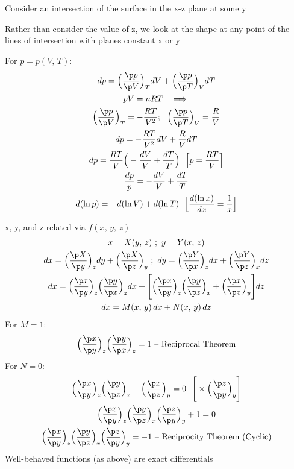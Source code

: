 \documentclass[a4paper, 11pt, normalem]{report}
\begin{document}
Consider an intersection of the surface in the x-z plane at some y

Rather than consider the value of z, we look at the shape at any point of the lines of intersection with planes constant x or y

For $p = p(V,\,T)$:
\begin{gather*}
    dp = \Big(\frac{\p p}{\p V}\Big)_T dV + \Big(\frac{\p p}{\p T}\Big)_V dT \\
    pV = nRT ~~\implies \\
    \Big(\frac{\p p}{\p V}\Big)_T = -\frac{RT}{V^2};~~ \Big(\frac{\p p}{\p T}\Big)_V = \frac{R}{V} \\
    dp = -\frac{RT}{V^2}dV + \frac{R}{V}dT \\
    dp = \frac{RT}{V}\Big(- \frac{dV}{V} + \frac{dT}{T}\Big)~~ \Big[p = \frac{RT}{V}\Big] \\
    \frac{dp}{p} = - \frac{dV}{V} + \frac{dT}{T} \\
    d(\ln{p}) = -d(\ln{V}) + d(\ln{T})~~ \Big[\frac{d(\ln{x})}{dx} = \frac{1}{x} \Big]
\end{gather*}

x, y, and z related via $f(x,\,y,\,z)$
\begin{gather*}
    x = X(y,\,z)~;~ y = Y(x,\,z) \\
    dx = \Big(\frac{\p X}{\p y} \Big)_z dy + \Big(\frac{\p X}{\p z} \Big)_y ~;~ dy = \Big(\frac{\p Y}{\p x} \Big)_z dx + \Big(\frac{\p Y}{\p z} \Big)_x dz \\
    dx = \Big(\frac{\p x}{\p y} \Big)_z \Big(\frac{\p y}{\p x} \Big)_z dx + \Bigg[\Big(\frac{\p x}{\p y} \Big)_z \Big(\frac{\p y}{\p z} \Big)_x + \Big(\frac{\p x}{\p z} \Big)_y \Bigg] dz \\
    dx = M(x,\,y)\,dx + N(x,\,y)\,dz
\end{gather*}
For $M = 1$:
\begin{equation*}
    \Big(\frac{\p x}{\p y} \Big)_z \Big(\frac{\p y}{\p x} \Big)_z = 1 \text{ -- Reciprocal Theorem}
\end{equation*}
For $N = 0$:
\begin{gather*}
    \Big(\frac{\p x}{\p y} \Big)_z \Big(\frac{\p y}{\p z} \Big)_x + \Big(\frac{\p x}{\p z} \Big)_y = 0 ~~ \Bigg[ \times \Big(\frac{\p z}{\p y} \Big)_y \Bigg] \\
    \Big(\frac{\p x}{\p y} \Big)_z \Big(\frac{\p y}{\p z} \Big)_x \Big(\frac{\p z}{\p y} \Big)_y + 1 = 0 \\
    \Big(\frac{\p x}{\p y} \Big)_z \Big(\frac{\p y}{\p z} \Big)_x \Big(\frac{\p z}{\p y} \Big)_y = -1 \text{ -- Reciprocity Theorem (Cyclic)}
\end{gather*}
Well-behaved functions (as above) are exact differentials
\end{document}
